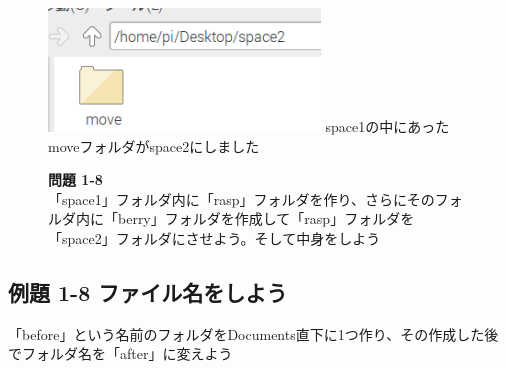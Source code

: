 \begin{figure}[htbp]
  \begin{minipage}{6.589cm}
    \includegraphics[width=7.218cm]{text01-img/textbook-img045.png}
    { space1の中にあったmoveフォルダがspace2にしました
    }
  \end{minipage}

  \flushleft
  \noindent \textbf{問題 1-8}\\
  「space1」フォルダ内に「rasp」フォルダを作り、さらにそのフォルダ内に「berry」フォルダを作成して「rasp」フォルダを「space2」フォルダにさせよう。そして中身をしよう
  
\end{figure}

\clearpage


\subsection{例題 1-8 ファイル名をしよう}
\noindent「before」という名前のフォルダをDocuments直下に1つ作り、その作成した後でフォルダ名を「after」に変えよう

